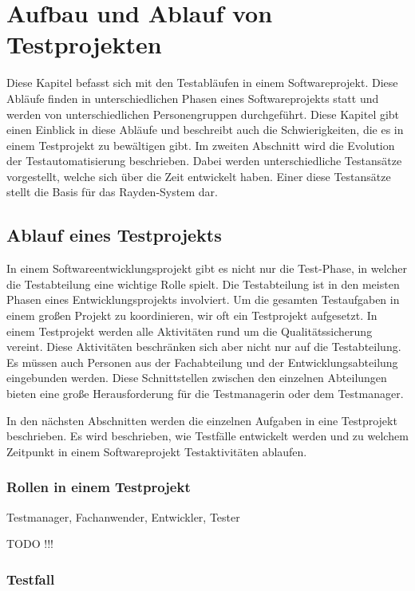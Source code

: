 \chapter{Aufbau und Ablauf von Testprojekten}
\label{cha:Konzept}

Diese Kapitel befasst sich mit den Testabläufen in einem Softwareprojekt. Diese Abläufe finden in unterschiedlichen Phasen eines Softwareprojekts statt und werden von unterschiedlichen Personengruppen durchgeführt. Diese Kapitel gibt einen Einblick in diese Abläufe und beschreibt auch die Schwierigkeiten, die es in einem Testprojekt zu bewältigen gibt. Im zweiten Abschnitt wird die Evolution der Testautomatisierung beschrieben. Dabei werden unterschiedliche Testansätze vorgestellt, welche sich über die Zeit entwickelt haben. Einer diese Testansätze stellt die Basis für das Rayden-System dar.

\section{Ablauf eines Testprojekts}

In einem Softwareentwicklungsprojekt gibt es nicht nur die Test-Phase, in welcher die Testabteilung eine wichtige Rolle spielt. Die Testabteilung ist in den meisten Phasen eines Entwicklungsprojekts involviert. Um die gesamten Testaufgaben in einem großen Projekt zu koordinieren, wir oft ein Testprojekt aufgesetzt. In einem Testprojekt werden alle Aktivitäten rund um die Qualitätssicherung vereint. Diese Aktivitäten beschränken sich aber nicht nur auf die Testabteilung. Es müssen auch Personen aus der Fachabteilung und der Entwicklungsabteilung eingebunden werden. Diese Schnittstellen zwischen den einzelnen Abteilungen bieten eine große Herausforderung für die Testmanagerin oder dem Testmanager.

\SuperPar
In den nächsten Abschnitten werden die einzelnen Aufgaben in eine Testprojekt beschrieben. Es wird beschrieben, wie Testfälle entwickelt werden und zu welchem Zeitpunkt in einem Softwareprojekt Testaktivitäten ablaufen.

\subsection{Rollen in einem Testprojekt}



Testmanager, Fachanwender, Entwickler, Tester

TODO !!!

\subsection{Testfall}

